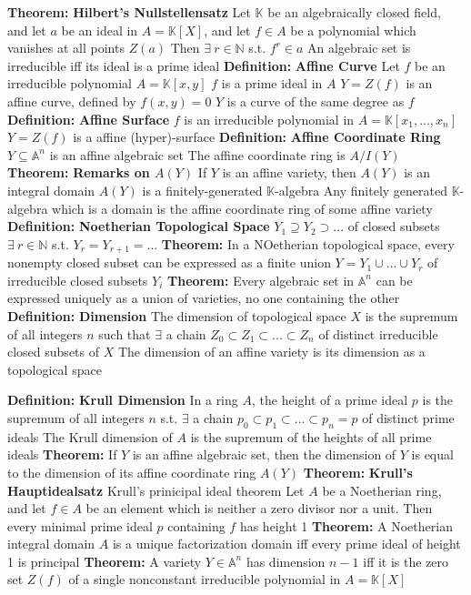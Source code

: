 \documentclass[14pt]{extarticle}
\def\Definition{{\color{blue} \textbf{Definition:} }}
\def\Theorem{{\color{red} \textbf{Theorem:} }}
\begin{document}
\begin{outline}
		\1	\Theorem \textbf{Hilbert's Nullstellensatz}
			\2	Let $\mathbb{K}$ be an algebraically closed field, and let $a$ be
					an ideal in $A = \mathbb{K}[X]$, and let $f \in A$ be a polynomial
					which vanishes at all points $Z(a)$
			\2	Then $\exists~r \in \mathbb{N}$ s.t. $f^r \in a$
			\2	An algebraic set is irreducible iff its ideal is a prime ideal
		\1	\Definition \textbf{Affine Curve}
			\2	Let $f$ be an irreducible polynomial $A = \mathbb{K}[x,y]$
			\2	$f$ is a prime ideal in $A$
			\2	$Y = Z(f)$ is an affine curve, defined by $f(x,y) = 0$
			\2	$Y$ is a curve of the same degree as $f$
		\1	\Definition \textbf{Affine Surface}
			\2	$f$ is an irreducible polynomial in $A = \mathbb{K}[x_1,...,x_n]$
			\2	$Y = Z(f)$ is a affine (hyper)-surface
		\1	\Definition \textbf{Affine Coordinate Ring}
			\2	$Y \subseteq \mathbb{A}^n$ is an affine algebraic set
			\2	The affine coordinate ring is $A/I(Y)$
		\1	\Theorem \textbf{Remarks on $A(Y)$}
			\2	If $Y$ is an affine variety, then $A(Y)$ is an integral domain
			\2	$A(Y)$ is a finitely-generated $\mathbb{K}$-algebra
			\2	Any finitely generated $\mathbb{K}$-algebra which is a domain is the 
					affine coordinate ring of some affine variety
		\1	\Definition \textbf{Noetherian Topological Space}
			\2	$Y_1 \supseteq Y_2 \supset ...$ of closed subsets
			\2	$\exists~r \in \mathbb{N}$ s.t. $Y_r = Y_{r+1} = ...$
		\1	\Theorem In a NOetherian topological space, every nonempty closed subset
				can be expressed as a finite union $Y = Y_1 \cup ... \cup Y_r$ of 
				irreducible closed subsets $Y_i$
		\1	\Theorem Every algebraic set in $\mathbb{A}^n$ can be expressed uniquely
				as a union of varieties, no one containing the other
		\1	\Definition \textbf{Dimension}
			\2	The dimension of topological space $X$ is the supremum of all integers
					$n$ such that $\exists$ a chain $Z_0 \subset Z_1 \subset ... \subset Z_n$
					of distinct irreducible closed subsets of $X$
			\2	The dimension of an affine variety is its dimension as a topological space

		\1	\Definition \textbf{Krull Dimension}
			\2	In a ring $A$, the height of a prime ideal $p$ is the supremum of all
					integers $n$ s.t. $\exists$ a chain $p_0 \subset p_1 \subset ... \subset p_n = p$
					of distinct prime ideals
			\2	The Krull dimension of $A$ is the supremum of the heights of all prime
					ideals
		\1	\Theorem If $Y$ is an affine algebraic set, then the dimension of $Y$
				is equal to the dimension of its affine coordinate ring $A(Y)$
		\1	\Theorem \textbf{Krull's Hauptidealsatz}
			\2	Krull's prinicipal ideal theorem
			\2	Let $A$ be a Noetherian ring, and let $f \in A$ be an element which
					is neither a zero divisor nor a unit.  Then every minimal prime ideal
					$p$ containing $f$ has height 1
		\1	\Theorem A Noetherian integral domain $A$ is a unique factorization domain
				iff every prime ideal of height 1 is principal
		\1	\Theorem A variety $Y \in \mathbb{A}^n$ has dimension $n-1$ iff it is
				the zero set $Z(f)$ of a single nonconstant irreducible polynomial in
				$A = \mathbb{K}[X]$

\end{outline}
\end{document}
